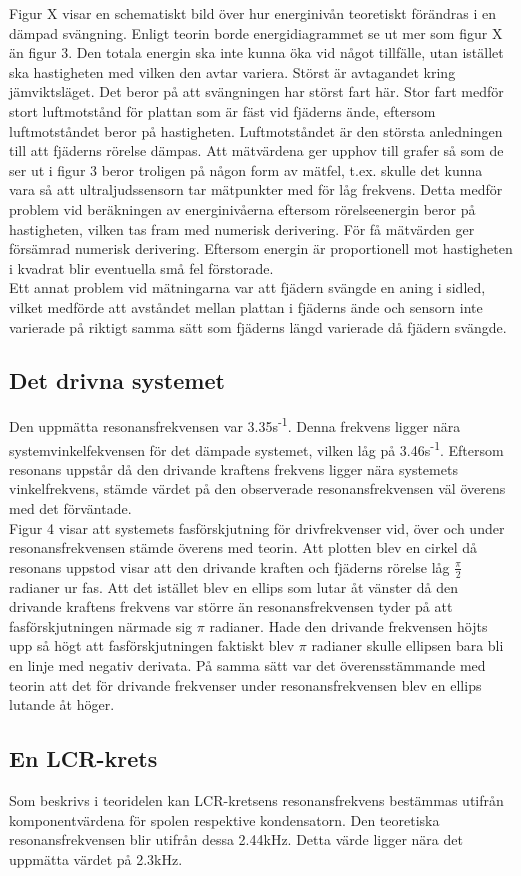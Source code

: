 \documentclass[a4paper,10pt]{article}
\begin{document}
Figur X visar en schematiskt bild över hur energinivån teoretiskt förändras i en dämpad svängning. Enligt teorin borde energidiagrammet se ut mer som figur X än figur 3. Den totala energin ska inte kunna öka vid något tillfälle, utan istället ska hastigheten med vilken den avtar variera. Störst är avtagandet kring jämviktsläget. Det beror på att svängningen har störst fart här. Stor fart medför stort luftmotstånd för plattan som är fäst vid fjäderns ände, eftersom luftmotståndet beror på hastigheten. Luftmotståndet är den största anledningen till att fjäderns rörelse dämpas. Att mätvärdena ger upphov till grafer så som de ser ut i figur 3 beror troligen på någon form av mätfel, t.ex. skulle det kunna vara så att ultraljudssensorn tar mätpunkter med för låg frekvens. Detta medför problem vid beräkningen av energinivåerna eftersom rörelseenergin beror på hastigheten, vilken tas fram med numerisk derivering. För få mätvärden ger försämrad numerisk derivering. Eftersom energin är proportionell mot hastigheten i kvadrat blir eventuella små fel förstorade.\\

Ett annat problem vid mätningarna var att fjädern svängde en aning i sidled, vilket medförde att avståndet mellan plattan i fjäderns ände och sensorn inte varierade på riktigt samma sätt som fjäderns längd varierade då fjädern svängde.

\subsection{Det drivna systemet}
Den uppmätta resonansfrekvensen var 3.35s\textsuperscript{-1}. Denna frekvens ligger nära systemvinkelfekvensen för det dämpade systemet, vilken låg på 3.46s\textsuperscript{-1}. Eftersom resonans uppstår då den drivande kraftens frekvens ligger nära systemets vinkelfrekvens, stämde värdet på den observerade resonansfrekvensen väl överens med det förväntade.\\

Figur 4 visar att systemets fasförskjutning för drivfrekvenser vid, över och under resonansfrekvensen stämde överens med teorin. Att plotten blev en cirkel då resonans uppstod visar att den drivande kraften och fjäderns rörelse låg $\frac{\pi}{2}$ radianer ur fas. Att det istället blev en ellips som lutar åt vänster då den drivande kraftens frekvens var större än resonansfrekvensen tyder på att fasförskjutningen närmade sig $\pi$ radianer. Hade den drivande frekvensen höjts upp så högt att fasförskjutningen faktiskt blev $\pi$ radianer skulle ellipsen bara bli en linje med negativ derivata. På samma sätt var det överensstämmande med teorin att det för drivande frekvenser under resonansfrekvensen blev en ellips lutande åt höger.

\subsection{En LCR-krets}
Som beskrivs i teoridelen kan LCR-kretsens resonansfrekvens bestämmas utifrån komponentvärdena för spolen respektive kondensatorn. Den teoretiska resonansfrekvensen blir utifrån dessa 2.44kHz. Detta värde ligger nära det uppmätta värdet på 2.3kHz.
\end{document}
